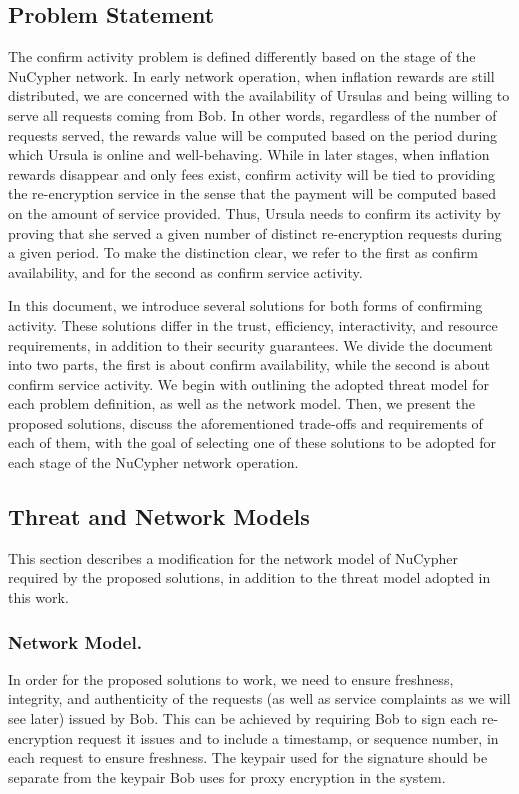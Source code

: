 \subsection{Problem Statement}
The confirm activity problem is defined differently based on the stage of the 
NuCypher network. In early network operation, when inflation rewards are 
still distributed, we are concerned with the availability of Ursulas and being willing to 
serve all requests coming from Bob. In other words, regardless of the number of 
requests served, the rewards value will be computed based on the period during which Ursula 
is online and well-behaving. While in later stages, when inflation rewards disappear 
and only fees exist, confirm activity will be tied to providing the re-encryption 
service in the sense that the payment will be computed based on the amount of 
service provided. Thus, Ursula needs to confirm its activity by proving that she served 
a given number of distinct re-encryption requests during a given period. To make the distinction 
clear, we refer to the first as confirm availability, and for the second as confirm 
service activity.


In this document, we introduce several solutions for both forms of confirming activity. 
These solutions differ in the trust, efficiency, interactivity, and resource 
requirements, in addition to their security guarantees. We divide the document into 
two parts, the first is about confirm availability, while the second is about confirm 
service activity. We begin with outlining the adopted threat model for each problem 
definition, as well as the network model. Then, we present the proposed solutions, discuss the aforementioned
trade-offs and requirements of each of them, with the goal of selecting one of these 
solutions to be adopted for each stage of the NuCypher network operation.


\subsection{Threat and Network Models}
\label{threat-network-model}
This section describes a modification for the network model of NuCypher 
required by the proposed solutions, in 
addition to the threat model adopted in this work.


\subsubsection{Network Model.}
In order for the proposed solutions to work, we need to ensure freshness, 
integrity, and authenticity of the requests (as well as service complaints as we will see later) issued by Bob. This can be achieved 
by requiring Bob to sign each re-encryption request it issues and to include a timestamp, or 
sequence number, in each request to ensure freshness. The keypair used for the 
signature should be separate from the keypair Bob uses for proxy encryption in the 
system. 


